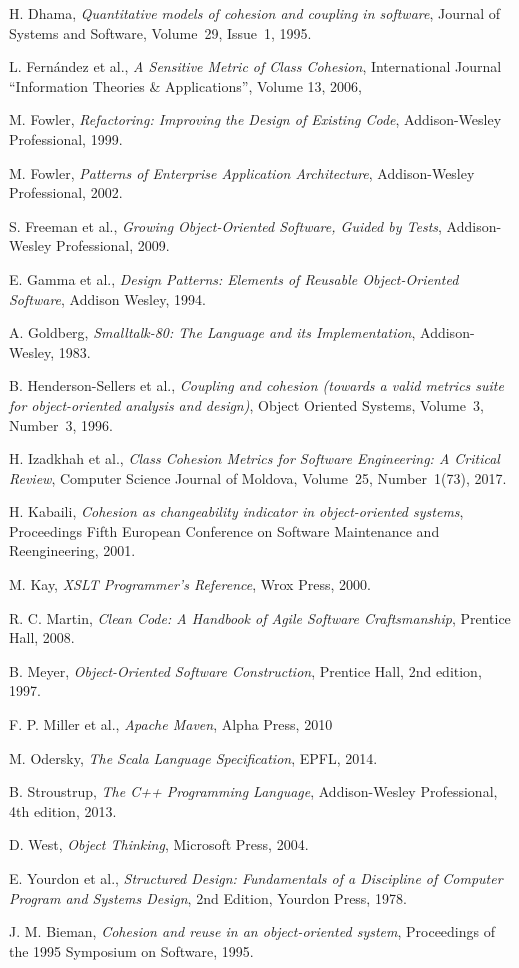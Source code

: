\documentclass[conference]{IEEEtran}
\begin{document}
\begin{thebibliography}{}
{
H. Dhama,
\emph{Quantitative models of cohesion and coupling in software},
Journal of Systems and Software,
Volume~29, Issue~1, 1995.

L. Fern\'andez et al.,
\emph{A Sensitive Metric of Class Cohesion},
International Journal ``Information Theories \& Applications'',
Volume 13, 2006,

M. Fowler,
\emph{Refactoring: Improving the Design of Existing Code},
Addison-Wesley Professional, 1999.

M. Fowler,
\emph{Patterns of Enterprise Application Architecture},
Addison-Wesley Professional, 2002.

S. Freeman et al.,
\emph{Growing Object-Oriented Software, Guided by Tests},
Addison-Wesley Professional, 2009.

E. Gamma et al.,
\emph{Design Patterns: Elements of Reusable Object-Oriented Software},
Addison Wesley, 1994.

A. Goldberg,
\emph{Smalltalk-80: The Language and its Implementation},
Addison-Wesley, 1983.

B. Henderson-Sellers et al.,
\emph{Coupling and cohesion (towards a valid metrics suite for object-oriented analysis and design)},
Object Oriented Systems, Volume~3, Number~3, 1996.

H. Izadkhah et al.,
\emph{Class Cohesion Metrics for Software Engineering: A Critical Review},
Computer Science Journal of Moldova, Volume~25, Number~1(73), 2017.

H. Kabaili,
\emph{Cohesion as changeability indicator in object-oriented systems},
Proceedings Fifth European Conference on Software Maintenance and Reengineering, 2001.

M. Kay,
\emph{XSLT Programmer's Reference},
Wrox Press, 2000.

R. C. Martin,
\emph{Clean Code: A Handbook of Agile Software Craftsmanship},
Prentice Hall, 2008.

B. Meyer,
\emph{Object-Oriented Software Construction},
Prentice Hall, 2nd edition, 1997.

F. P. Miller et al.,
\emph{Apache Maven},
Alpha Press, 2010

M. Odersky,
\emph{The Scala Language Specification},
EPFL, 2014.

B. Stroustrup,
\emph{The C++ Programming Language},
Addison-Wesley Professional, 4th edition, 2013.

D. West,
\emph{Object Thinking},
Microsoft Press, 2004.

E. Yourdon et al.,
\emph{Structured Design: Fundamentals of a Discipline of Computer Program and Systems Design},
2nd Edition, Yourdon Press, 1978.

J. M. Bieman,
\emph{Cohesion and reuse in an object-oriented system},
Proceedings of the 1995 Symposium on Software, 1995.
}

\end{thebibliography}
\end{document}
